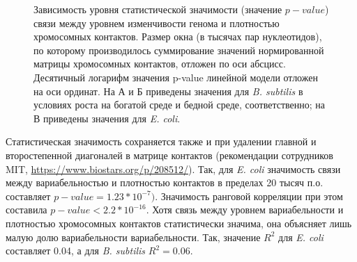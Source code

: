 \begin{figure}[!ht] 
  \center
  \hfill
  \hfill

  \caption{Зависимость уровня статистической значимости (значение $p-value$) связи между уровнем изменчивости генома и плотностью хромосомных контактов. Размер окна (в тысячах пар нуклеотидов), по которому производилось суммирование значений нормированной матрицы хромосомных контактов, отложен по оси абсцисс. Десятичный логарифм значения p-value линейной модели отложен на оси ординат. На А и Б приведены значения для \textit{B. subtilis} в условиях роста на богатой среде и бедной среде, соответственно; на В приведены значения для \textit{E. coli}.} 
  \label{img:hic_coli_subtilis}  
\end{figure}

Статистическая значимость сохраняется также и при удалении главной и второстепенной диагоналей в матрице контактов (рекомендации сотрудников MIT, \url{https://www.biostars.org/p/208512/}). Так, для \textit{E. coli} значимость связи между вариабельностью и плотностью контактов в пределах 20 тысяч п.о. составляет $p-value = 1.23*10^{-7})$. Значимость ранговой корреляции при этом составила $p-value < 2.2*10^{-16}$. 
Хотя связь между уровнем вариабельности и плотностью хромосомных контактов статистически значима, она объясняет лишь малую долю вариабельности вариабельности. Так, значение $R^2$ для \textit{E. coli} составляет 0.04, а для \textit{B. subtilis} $R^2 = 0.06$.







